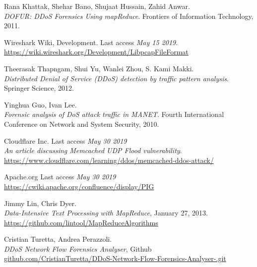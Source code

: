 \begin{thebibliography}{9}
Rana Khattak, Shehar Bano, Shujaat Hussain, Zahid Anwar. 
\\\textit{DOFUR: DDoS Forensics Using mapReduce}. Frontiers of Information Technology, 2011.

Wireshark Wiki, Development. Last access \textit{May 15 2019}.
\\\url{https://wiki.wireshark.org/Development/LibpcapFileFormat}

Theerasak Thapngam, Shui Yu, Wanlei Zhou, S. Kami Makki.
\\\textit{Distributed Denial of Service (DDoS) detection by traffic pattern analysis}.
Springer Science, 2012.

Yinghua Guo, Ivan Lee.
\\\textit{Forensic analysis of DoS attack traffic in MANET}. 
Fourth International Conference on Network and System Security, 2010.

Cloudflare Inc. Last access \textit{May 30 2019}
\\\textit{An article discussing Memcached UDP Flood vulnerability}. 
\\\url{https://www.cloudflare.com/learning/ddos/memcached-ddos-attack/}

Apache.org Last access \textit{May 30 2019}
\\\url{https://cwiki.apache.org/confluence/display/PIG}

Jimmy Lin, Chris Dyer.
\\\textit{Data-Intensive Text Processing with MapReduce}, January 27, 2013.
\\\url{https://github.com/lintool/MapReduceAlgorithms}

Cristian Turetta, Andrea Perazzoli.
\\\textit{DDoS Network Flow Forensics Analyser}, Github
\\\href{https://github.com/CristianTuretta/DDoS-Network-Flow-Forensics-Analyser-.git}{github.com/CristianTuretta/DDoS-Network-Flow-Forensics-Analyser-.git}

\end{thebibliography}